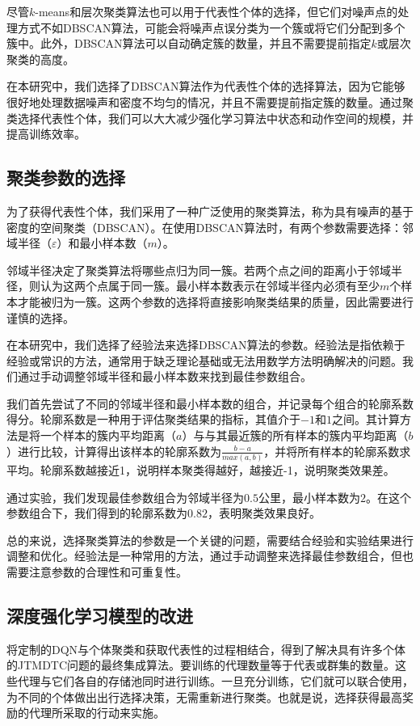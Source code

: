 尽管$k$-means和层次聚类算法也可以用于代表性个体的选择，但它们对噪声点的处理方式不如DBSCAN算法，可能会将噪声点误分类为一个簇或将它们分配到多个簇中。此外，DBSCAN算法可以自动确定簇的数量，并且不需要提前指定$k$或层次聚类的高度。

在本研究中，我们选择了DBSCAN算法作为代表性个体的选择算法，因为它能够很好地处理数据噪声和密度不均匀的情况，并且不需要提前指定簇的数量。通过聚类选择代表性个体，我们可以大大减少强化学习算法中状态和动作空间的规模，并提高训练效率。


\subsection{聚类参数的选择}
为了获得代表性个体，我们采用了一种广泛使用的聚类算法，称为具有噪声的基于密度的空间聚类（DBSCAN）\citep{ester1996density}。在使用DBSCAN算法时，有两个参数需要选择：邻域半径（$\varepsilon$）和最小样本数（$m$）。

邻域半径决定了聚类算法将哪些点归为同一簇。若两个点之间的距离小于邻域半径，则认为这两个点属于同一簇。最小样本数表示在邻域半径内必须有至少$m$个样本才能被归为一簇。这两个参数的选择将直接影响聚类结果的质量，因此需要进行谨慎的选择。

在本研究中，我们选择了经验法来选择DBSCAN算法的参数。经验法是指依赖于经验或常识的方法，通常用于缺乏理论基础或无法用数学方法明确解决的问题。我们通过手动调整邻域半径和最小样本数来找到最佳参数组合。

我们首先尝试了不同的邻域半径和最小样本数的组合，并记录每个组合的轮廓系数得分。轮廓系数是一种用于评估聚类结果的指标，其值介于$-1$和$1$之间。其计算方法是将一个样本的簇内平均距离（$a$）与与其最近簇的所有样本的簇内平均距离（$b$）进行比较，计算得出该样本的轮廓系数为$\frac{b-a}{max(a,b)}$，并将所有样本的轮廓系数求平均。轮廓系数越接近1，说明样本聚类得越好，越接近-1，说明聚类效果差。

通过实验，我们发现最佳参数组合为邻域半径为$0.5$公里，最小样本数为$2$。在这个参数组合下，我们得到的轮廓系数为$0.82$，表明聚类效果良好。

总的来说，选择聚类算法的参数是一个关键的问题，需要结合经验和实验结果进行调整和优化。经验法是一种常用的方法，通过手动调整来选择最佳参数组合，但也需要注意参数的合理性和可重复性。

\subsection{深度强化学习模型的改进}
将定制的DQN与个体聚类和获取代表性的过程相结合，得到了解决具有许多个体的JTMDTC问题的最终集成算法。要训练的代理数量等于代表或群集的数量。这些代理与它们各自的存储池同时进行训练。一旦充分训练，它们就可以联合使用，为不同的个体做出出行选择决策，无需重新进行聚类。也就是说，选择获得最高奖励的代理所采取的行动来实施。


